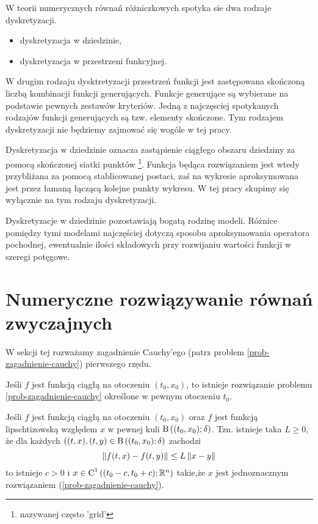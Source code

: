 \documentclass[12pt,a4paper]{report}
\begin{document}
W teorii numerycznych równań różniczkowych spotyka sie dwa rodzaje dyskretyzacji.
\begin{itemize}
\item dyskretyzacja w dziedzinie,
\item dyskretyzacja w przestrzeni funkcyjnej.
\end{itemize}

W drugim rodzaju dysktretyzacji przestrzeń funkcji jest zastępowana skończoną liczbą kombinacji funkcji generujących. Funkcje generujące są wybierane na podstawie pewnych zestawów kryteriów. Jedną z najczęsciej spotykanych rodzajów funkcji generujących są tzw. elementy skończone. Tym rodzajem dyskretyzacji nie będziemy zajmować się wogóle w tej pracy.

Dyskretyzacja w dziedzinie oznacza zastąpienie ciągłego obszaru dziedziny za pomocą skończonej siatki punktów \footnote{nazywanej często 'grid'}. Funkcja będąca rozwiązaniem jest wtedy przybliżana za pomocą stablicowanej postaci, zaś na wykresie aproksymowana jest przez łamaną łączącą kolejne punkty wykresu. W tej pracy skupimy się wyłącznie na tym rodzaju dyskretyzacji. 

Dyskretyzacje w dziedzinie pozostawiają bogatą rodzinę modeli. Różnice pomiędzy tymi modelami najczęściej dotyczą sposobu aproksymowania operatora pochodnej, ewentualnie ilości składowych przy rozwijaniu wartości funkcji w szeregi potęgowe. 


\section{Numeryczne rozwiązywanie równań zwyczajnych}

W sekcji tej rozważamy zagadnienie Cauchy'ego (patrz problem \ref{prob-zagadnienie-cauchy}) pierwszego rzędu. 


\begin{theorem}[Peano]
Jeśli $f$ jest funkcją ciągłą na otoczeniu $(t_{0},x_{0})$, to istnieje rozwiązanie problemu \ref{prob-zagadnienie-cauchy} określone w pewnym otoczeniu $t_{0}$. 
\end{theorem}

\begin{theorem}
Jeśli $f$ jest funkcją ciągłą na otoczeniu $(t_{0},x_{0})$ oraz $f$ jest funkcją lipschtizowską względem $x$ w pewnej kuli $\ball{(t_0,x_0)}{\delta}$. Tzn.
 istnieje taka $L\geq 0$, że dla każdych $((t,x),(t,y) \in \ball{(t_0,x_0)}{\delta} $ zachodzi
$$
  \left\| {f(t,x) - f(t,y)} \right\|_{} \leq L \left\| { x-y} \right\|_{} 
$$
 to istnieje $ c> 0 $ i $x \in \Ck{1}{(t_0-c,t_0+c); \setR^{n} }  $ takie,że $x$ jest jednoznacznym rozwiązaniem (\ref{prob-zagadnienie-cauchy}).
\end{theorem}
\end{document}
